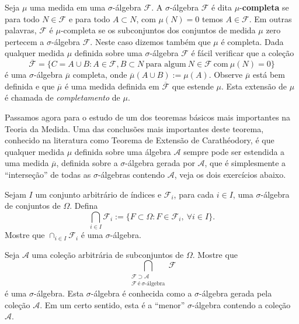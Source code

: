 \medskip
Seja $\mu$ uma medida em uma $\sigma$-álgebra $\mathcal{F}$.
A $\sigma$-álgebra $\mathcal{F}$ é dita $\mu$-{\bf completa} 
se para todo $N\in \mathcal{F}$ e para todo $A\subset N$, 
com $\mu(N)=0$ temos $A\in \mathcal{F}$.
Em outras palavras, $\mathcal{F}$ é $\mu$-completa 
se os subconjuntos dos conjuntos de medida $\mu$ zero
pertecem a $\sigma$-álgebra $\mathcal{F}$.
Neste caso dizemos também que $\mu$ é completa.
Dada qualquer medida $\mu$ definida sobre uma 
$\sigma$-álgebra $\mathcal{F}$ é fácil verificar que 
a coleção 
$$
\overline{\mathcal{F}}
=
\{ 	
	C=A\cup B: A\in\mathcal{F}, B\subset N\ \text{para algum}\ N\in\mathcal{F}\ \text{com}\ \mu(N)=0	
\}
$$
é uma $\sigma$-álgebra $\overline{\mu}$ completa, onde $\overline{\mu}(A\cup B):=\mu(A)$.
Observe $\overline{\mu}$ está bem definida e 
que $\overline{\mu}$ é uma medida definida em $\overline{\mathcal{F}}$ que estende $\mu$.
Esta extensão de $\mu$ é chamada de  
{\it completamento}
de $\mu$.





Passamos agora para o estudo de um dos teoremas básicos mais importantes 
na Teoria da Medida. 
Uma das conclusões mais importantes deste teorema, conhecido na literatura como 
Teorema de Extensão de Carathéodory, 
é que qualquer medida $\mu$ definida sobre uma álgebra
$\mathcal{A}$ sempre pode ser estendida 
a uma medida $\overline{\mu}$, 
definida sobre a
$\sigma$-álgebra gerada por $\mathcal{A}$, que 
é simplesmente a ``interseção'' de todas as $\sigma$-álgebras 
contendo $\mathcal{A}$, veja os dois exercícios abaixo.

\begin{exercicio}
	Sejam $I$ um conjunto arbitrário de índices e 
	$\mathcal{F}_i$, para cada $i\in I$,
	uma $\sigma$-álgebra de conjuntos de $\Omega$.
	Defina 
	$$
	\bigcap_{i\in I}\mathcal{F}_i := 
	\{F\subset \Omega: F\in\mathcal{F}_i, \ \forall i\in I\}.
	$$
	Mostre que $\cap_{i\in I}\mathcal{F}_i$ é uma $\sigma$-álgebra.
\end{exercicio}


\begin{exercicio}\label{exercicio-sigma-alg-gerada}
	Seja $\mathcal{A}$ uma coleção arbitrária de subconjuntos de $\Omega$.
	Mostre que 
	$$
	\bigcap_{\substack{ \mathcal{F}\supset \mathcal{A}\\[0.1cm] \mathcal{F}\ \text{é}\ 
	\sigma\text{-álgebra}}}
	 \!\!\!\!\!\!\!\!\! \mathcal{F}
	$$
	é uma $\sigma$-álgebra. Esta $\sigma$-álgebra é conhecida como a 
	$\sigma$-álgebra
	gerada pela coleção $\mathcal{A}$. Em um certo sentido, esta é a ``menor'' 
	$\sigma$-álgebra contendo a coleção $\mathcal{A}$.
\end{exercicio}



